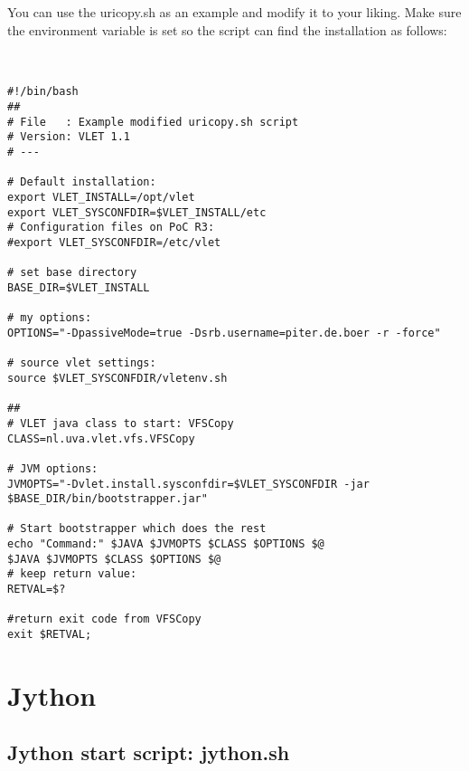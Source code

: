 You can use the uricopy.sh as an example and modify it to your liking. Make sure 
the \VLETINSTALL environment variable is set so the script can find the
installation as follows: \\
\\
\hspace*{5mm}\begin{boxedminipage}{165mm}
\begin{verbatim}

#!/bin/bash 
##
# File   : Example modified uricopy.sh script 
# Version: VLET 1.1
# --- 

# Default installation: 
export VLET_INSTALL=/opt/vlet
export VLET_SYSCONFDIR=$VLET_INSTALL/etc
# Configuration files on PoC R3: 
#export VLET_SYSCONFDIR=/etc/vlet

# set base directory 
BASE_DIR=$VLET_INSTALL

# my options: 
OPTIONS="-DpassiveMode=true -Dsrb.username=piter.de.boer -r -force"

# source vlet settings: 
source $VLET_SYSCONFDIR/vletenv.sh 

##
# VLET java class to start: VFSCopy 
CLASS=nl.uva.vlet.vfs.VFSCopy

# JVM options: 
JVMOPTS="-Dvlet.install.sysconfdir=$VLET_SYSCONFDIR -jar $BASE_DIR/bin/bootstrapper.jar"

# Start bootstrapper which does the rest 
echo "Command:" $JAVA $JVMOPTS $CLASS $OPTIONS $@
$JAVA $JVMOPTS $CLASS $OPTIONS $@
# keep return value: 
RETVAL=$? 

#return exit code from VFSCopy
exit $RETVAL; 

\end{verbatim}
\end{boxedminipage}

\section{Jython}

\subsection{Jython start script: jython.sh}

